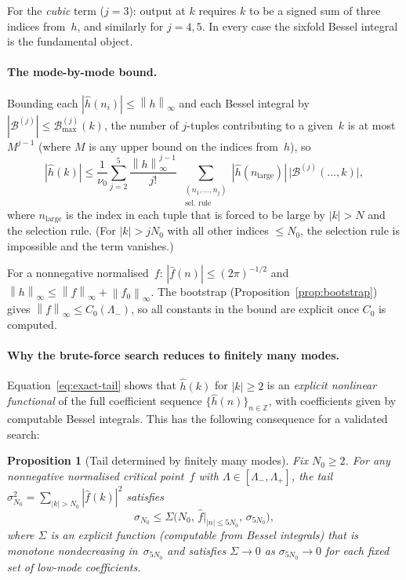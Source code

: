 \documentclass[12pt]{article}
\newtheorem{proposition}[theorem]{Proposition}
\theoremstyle{definition}
\theoremstyle{remark}
\newcommand{\Z}{\mathbb{Z}}
\newcommand{\wh}{\widehat}
\newcommand{\norm}[1]{\left\|#1\right\|}
\begin{document}
For the \emph{cubic} term ($j=3$): output at $k$ requires $k$ to be
a signed sum of three indices from~$h$, and similarly for $j=4,5$.
In every case the sixfold Bessel integral is the fundamental object.

\paragraph{The mode-by-mode bound.}
Bounding each $|\wh h(n_i)|\leq\norm{h}_\infty$ and each Bessel
integral by $|\mathcal B^{(j)}|\leq\mathcal B_{\max}^{(j)}(k)$, the
number of $j$-tuples contributing to a given~$k$ is at most~$M^{j-1}$
(where $M$ is any upper bound on the indices from~$h$), so
\begin{equation}\label{eq:exact-tail-bound}
  |\wh h(k)|
  \leq
  \frac{1}{\nu_0}\sum_{j=2}^{5}
  \frac{\norm{h}_\infty^{j-1}}{j!}
  \;\sum_{\substack{(n_1,\ldots,n_j)\\\text{sel. rule}}}
  |\wh h(n_{\mathrm{large}})|\,
  \bigl|\mathcal B^{(j)}(\ldots,k)\bigr|,
\end{equation}
where $n_{\mathrm{large}}$ is the index in each tuple that is forced
to be large by $|k|>N$ and the selection rule.  (For $|k|>jN_0$
with all other indices $\leq N_0$, the selection rule is impossible
and the term vanishes.)

For a nonnegative normalised~$f$: $|\wh f(n)|\leq(2\pi)^{-1/2}$ and
$\norm{h}_\infty\leq\norm{f}_\infty+\norm{f_0}_\infty$.
The bootstrap (Proposition~\ref{prop:bootstrap}) gives
$\norm{f}_\infty\leq C_0(\Lambda_-)$, so all constants in the bound
are explicit once $C_0$ is computed.

\paragraph{Why the brute-force search reduces to finitely many modes.}
Equation~\eqref{eq:exact-tail} shows that $\wh h(k)$ for $|k|\geq 2$
is an \emph{explicit nonlinear functional} of the full coefficient
sequence $\{\wh h(n)\}_{n\in\Z}$, with coefficients given by
computable Bessel integrals.  This has the following consequence for
a validated search:

\begin{proposition}[Tail determined by finitely many modes]
  \label{prop:tail-from-finite}
  Fix $N_0\geq 2$.  For any nonnegative normalised critical point~$f$
  with $\Lambda\in[\Lambda_-,\Lambda_+]$, the tail
  $\sigma_{N_0}^2=\sum_{|k|>N_0}|\wh f(k)|^2$ satisfies
  \begin{equation}\label{eq:tail-from-finite}
    \sigma_{N_0}
    \leq
    \Sigma\bigl(N_0,\,\wh f|_{|n|\leq 5N_0},\,
    \sigma_{5N_0}\bigr),
  \end{equation}
  where $\Sigma$ is an explicit function (computable from Bessel
  integrals) that is \emph{monotone nondecreasing} in~$\sigma_{5N_0}$
  and satisfies $\Sigma\to 0$ as $\sigma_{5N_0}\to 0$ for each fixed
  set of low-mode coefficients.
\end{proposition}
\end{document}
